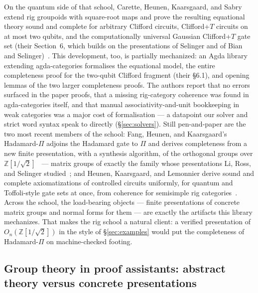 On the quantum side of that school, Carette, Heunen, Kaarsgaard, and
Sabry extend rig groupoids with square-root maps and prove the resulting
equational theory sound and complete for arbitrary Clifford circuits,
Clifford+$T$ circuits on at most two qubits, and the computationally
universal Gaussian Clifford+$T$ gate set (their Section~6, which builds
on the presentations of Selinger and of Bian and
Selinger)~\cite{carette2024squareroots}.  This development, too, is
partially mechanized: an Agda library extending agda-categories
formalises the equational model, the entire completeness proof for the
two-qubit Clifford fragment (their \S6.1), and opening lemmas of the two
larger completeness proofs.  The authors report that no errors surfaced
in the paper proofs, that a missing rig-category coherence was found in
agda-categories itself, and that manual associativity-and-unit
bookkeeping in weak categories was a major cost of formalisation --- a
datapoint our  solver and strict word syntax speak to
directly (\S\ref{sec:solvers}).  Still pen-and-paper are the two most
recent members of the school: Fang, Heunen, and Kaarsgaard's
Hadamard-$\Pi$ adjoins the Hadamard gate to $\Pi$ and derives
completeness from a new finite presentation, with a synthesis algorithm,
of the orthogonal groups over
$\mathbb{Z}[1/\sqrt2]$~\cite{fang2026hadamard} --- matrix groups of
exactly the family whose presentations Li, Ross, and Selinger
studied~\cite{li2021on}; and Heunen, Kaarsgaard, and Lemonnier derive
sound and complete axiomatizations of controlled circuits uniformly, for
quantum and Toffoli-style gate sets at once, from coherence for
semisimple rig categories~\cite{heunen2026onerig}.  Across the school,
the load-bearing objects --- finite presentations of concrete matrix
groups and normal forms for them --- are exactly the artifacts this
library mechanizes.  That makes the rig
school a natural client: a verified presentation of
$O_n(\mathbb{Z}[1/\sqrt2])$ in the style of \S\ref{sec:examples} would
put the completeness of Hadamard-$\Pi$ on machine-checked footing.

\subsection{Group theory in proof assistants: abstract theory versus concrete presentations}

